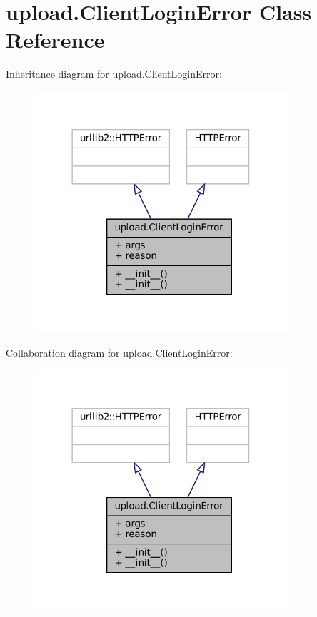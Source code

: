 \hypertarget{classupload_1_1ClientLoginError}{}\section{upload.\+Client\+Login\+Error Class Reference}
\label{classupload_1_1ClientLoginError}


Inheritance diagram for upload.\+Client\+Login\+Error\+:
\nopagebreak
\begin{figure}[H]
\begin{center}
\leavevmode
\includegraphics[width=266pt]{classupload_1_1ClientLoginError__inherit__graph}
\end{center}
\end{figure}


Collaboration diagram for upload.\+Client\+Login\+Error\+:
\nopagebreak
\begin{figure}[H]
\begin{center}
\leavevmode
\includegraphics[width=266pt]{classupload_1_1ClientLoginError__coll__graph}
\end{center}
\end{figure}
